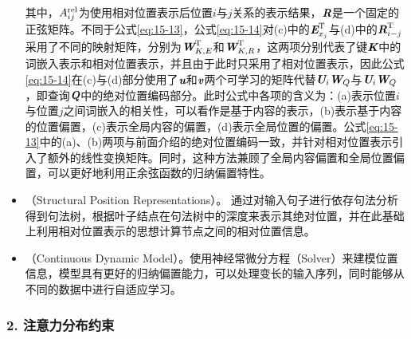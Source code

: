 \begin{itemize}
\noindent 其中，$A_{ij}^{\rm rel}$为使用相对位置表示后位置$i$与$j$关系的表示结果，$\textbf{\em R}$是一个固定的正弦矩阵。不同于公式\eqref{eq:15-13}，公式\eqref{eq:15-14}对(c)中的$\textbf{\em E}_{x_j}^{\textrm{T}}$与(d)中的$\textbf{\em R}_{i-j}^{\textrm{T}}$采用了不同的映射矩阵，分别为$\textbf{\em W}_{K,E}^{\textrm{T}}$和$\textbf{\em W}_{K,R}^{\textrm{T}}$，这两项分别代表了键$\textbf{\em K}$中的词嵌入表示和相对位置表示，并且由于此时只采用了相对位置表示，因此公式\eqref{eq:15-14}在(c)与(d)部分使用了$\textbf{\em u}$和$\textbf{\em v}$两个可学习的矩阵代替$\textbf{\em U}_i\textbf{\em W}_Q$与$\textbf{\em U}_i\textbf{\em W}_Q$，即查询$\textbf{\em Q}$中的绝对位置编码部分。此时公式中各项的含义为：(a)表示位置$i$与位置$j$之间词嵌入的相关性，可以看作是基于内容的表示，(b)表示基于内容的位置偏置，(c)表示全局内容的偏置，(d)表示全局位置的偏置。公式\eqref{eq:15-13}中的(a)、(b)两项与前面介绍的绝对位置编码一致，并针对相对位置表示引入了额外的线性变换矩阵。同时，这种方法兼顾了全局内容偏置和全局位置偏置，可以更好地利用正余弦函数的归纳偏置特性。

\vspace{0.5em}
\item {\small{}}（Structural Position Representations）。 通过对输入句子进行依存句法分析得到句法树，根据叶子结点在句法树中的深度来表示其绝对位置，并在此基础上利用相对位置表示的思想计算节点之间的相对位置信息。

\vspace{0.5em}
\item {\small{}}（Continuous Dynamic Model）。使用神经常微分方程{\small{}}（Solver）来建模位置信息，模型具有更好的归纳偏置能力，可以处理变长的输入序列，同时能够从不同的数据中进行自适应学习。
\vspace{0.5em}
\end{itemize}


\subsubsection{2. 注意力分布约束}

